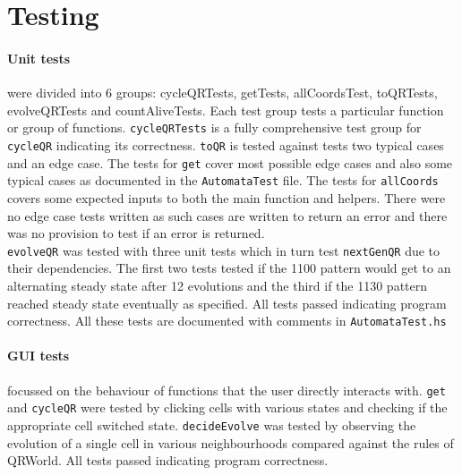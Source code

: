 \documentclass[11pt]{article}
\begin{document}
\section{Testing}%
\paragraph{Unit tests} were divided into 6 groups: cycleQRTests, getTests, allCoordsTest, toQRTests, evolveQRTests and countAliveTests. Each test group tests a particular function or group of functions. \verb|cycleQRTests| is a fully comprehensive test group for \verb|cycleQR| indicating its correctness. \verb|toQR| is tested against tests two typical cases and an edge case. The tests for \verb|get| cover most possible edge cases and also some typical cases as documented in the \verb|AutomataTest| file. The tests for \verb|allCoords| covers some expected inputs to both the main function and helpers. There were no edge case tests written as such cases are written to return an error and there was no provision to test if an error is returned.\\

 \verb|evolveQR| was tested with three unit tests which in turn test \verb|nextGenQR| due to their dependencies. The first two tests tested if the 1100 pattern would get to an alternating steady state after 12 evolutions and the third if the 1130 pattern reached steady state eventually as specified. All tests passed indicating program correctness. All these tests are documented with comments in \verb|AutomataTest.hs|
\paragraph{GUI tests} focussed on the behaviour of functions that the user directly interacts with. \verb|get| and \verb|cycleQR| were tested by clicking cells with various states and checking if the appropriate cell switched state. \verb|decideEvolve| was tested by observing the evolution of a single cell in various neighbourhoods compared against the rules of QRWorld. All tests passed indicating program correctness.
\end{document}
